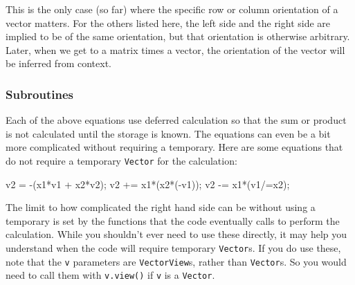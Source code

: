\documentclass[twoside,letterpaper,11pt]{article}
\renewcommand{\tt}[1]{{\lstinline {#1}}}
\begin{document}
This is the only case (so far)
where the specific row or column orientation of a vector matters.  For the others
listed here, the left side and the right side are implied to be of the same orientation, but
that orientation is otherwise arbitrary.
Later, when we get to a matrix times a vector, the orientation 
of the vector will be inferred from context.

\subsubsection{Subroutines}

Each of the above equations use deferred calculation so that the sum or product is not calculated
until the storage is known.  The equations can even be a bit more complicated without 
requiring a temporary.  Here are some equations that do not require a temporary 
\tt{Vector} for the calculation:

\begin{tmvcode}
v2 = -(x1*v1 + x2*v2);
v2 += x1*(x2*(-v1));
v2 -= x1*(v1/=x2);
\end{tmvcode}

The limit to how complicated the right hand side can be without using a 
temporary is set by the 
functions that the code eventually calls to perform the calculation.  
While you shouldn't ever
need to use these directly, it may help you understand when the code will require 
temporary \tt{Vector}s.  If you do use these, note that the \tt{v} parameters
are \tt{VectorView}s, rather than \tt{Vector}s.  So you would need to 
call them with \tt{v.view()} if \tt{v} is a \tt{Vector}.
\end{document}
